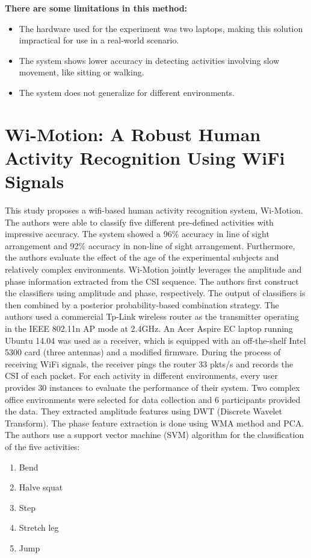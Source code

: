 \textbf{There are some limitations in this method:}

\begin{itemize}
\item The hardware used for the experiment was two laptops, making this solution impractical for use in a real-world scenario. 
\item The system shows lower accuracy in detecting activities involving slow movement, like sitting or walking.
\item The system does not generalize for different environments.
\end{itemize}



\section{Wi-Motion: A Robust Human Activity Recognition Using WiFi Signals}
This study \cite{8873550}proposes a wifi-based human activity recognition system, Wi-Motion. The authors were able to classify five different pre-defined activities with impressive accuracy. The system showed a 96\% accuracy in line of sight arrangement and 92\% accuracy in non-line of sight arrangement. Furthermore, the authors evaluate the effect of the age of the experimental subjects and relatively complex environments. Wi-Motion jointly leverages the amplitude and phase information extracted from the CSI sequence. The authors first construct the classifiers using amplitude and phase, respectively. The output of classifiers is then combined by a posterior probability-based combination strategy. The authors used a commercial Tp-Link wireless router as the transmitter operating in the IEEE 802.11n AP mode at 2.4GHz. An Acer Aspire EC laptop running Ubuntu 14.04 was used as a receiver, which is equipped with an off-the-shelf Intel 5300 card (three antennas) and a modified firmware. During the process of receiving WiFi signals, the receiver pings the router 33 pkts/s and records the CSI of each packet. For each activity in different environments, every user provides 30 instances to evaluate the performance of their system. Two complex office environments were selected for data collection and 6 participants provided the data. They extracted amplitude features using DWT (Discrete Wavelet Transform). The phase feature extraction is done using WMA method and PCA. The authors use a support vector machine (SVM) algorithm for the classification of the five activities:
\begin{enumerate}
    \item Bend
    \item Halve squat
    \item Step
    \item Stretch leg
    \item Jump
\end{enumerate}

